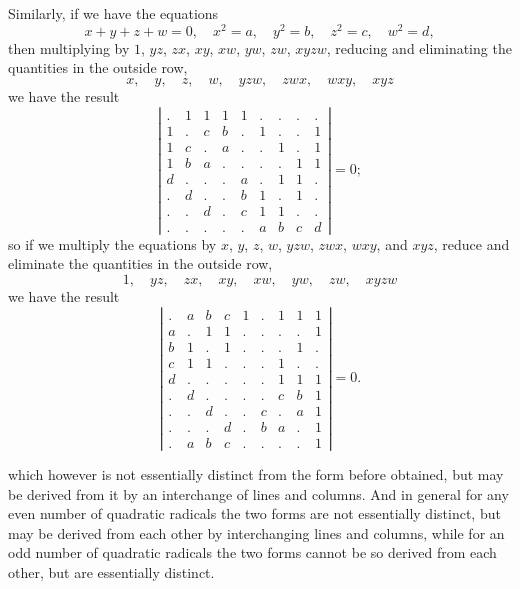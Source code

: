 \documentclass[11pt]{article}
\begin{document}
Similarly, if we have the equations
\[
x + y + z + w = 0, \quad x^2 = a, \quad y^2 = b, \quad z^2 = c, \quad w^2 = d,
\]
then multiplying by $1$, $yz$, $zx$, $xy$, $xw$, $yw$, $zw$, $xyzw$, reducing and eliminating the quantities in the outside row,
\[
x, \quad y, \quad z, \quad w, \quad yzw, \quad zwx, \quad wxy, \quad xyz
\]
we have the result
\[
\left|\begin{array}{cccc|c|ccc|c}
. & 1 & 1 & 1 & 1 & . & . & . & . \\
1 & . & c & b & . & 1 & . & . & 1 \\
1 & c & . & a & . & . & 1 & . & 1 \\
1 & b & a & . & . & . & . & 1 & 1 \\
\hline
d & . & . & . & a & . & 1 & 1 & . \\
. & d & . & . & b & 1 & . & 1 & . \\
. & . & d & . & c & 1 & 1 & . & . \\
\hline
. & . & . & . & . & a & b & c & d
\end{array}\right| = 0;
\]
so if we multiply the equations by $x$, $y$, $z$, $w$, $yzw$, $zwx$, $wxy$, and $xyz$, reduce and eliminate the quantities in the outside row,
\[
1, \quad yz, \quad zx, \quad xy, \quad xw, \quad yw, \quad zw, \quad xyzw
\]
we have the result
\[
\left|\begin{array}{cccc|c|ccc|c}
. & a & b & c & 1 & . & 1 & 1 & 1 \\
a & . & 1 & 1 & . & . & . & . & 1 \\
b & 1 & . & 1 & . & . & . & 1 & . \\
c & 1 & 1 & . & . & . & 1 & . & . \\
\hline
d & . & . & . & . & . & 1 & 1 & 1 \\
. & d & . & . & . & . & c & b & 1 \\
. & . & d & . & . & c & . & a & 1 \\
. & . & . & d & . & b & a & . & 1 \\
\hline
. & a & b & c & . & . & . & . & 1
\end{array}\right| = 0.
\]

\newpage
\setcounter{page}{42}

which however is not essentially distinct from the form before obtained, but may be derived from it by an interchange of lines and columns. And in general for any even number of quadratic radicals the two forms are not essentially distinct, but may be derived from each other by interchanging lines and columns, while for an odd number of quadratic radicals the two forms cannot be so derived from each other, but are essentially distinct.
\end{document}
